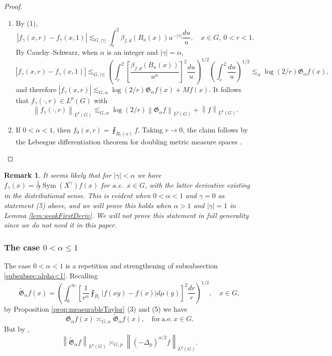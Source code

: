 \documentclass[11pt,reqno]{amsart}
\newtheorem{remark}[theorem]{Remark}
\newcommand{\1}{\mathbf 1}
\begin{document}
\begin{proof}
\begin{enumerate}
\item By (1),
\[
\left|f_\gamma \left(x,r\right)-f_\gamma\left(x,1\right)\right|\lesssim_{G,\left|\gamma\right|} \int_{r}^{2} \beta_{f,d}\left(B_u\left(x\right)\right)u^{-\left|\gamma\right|}\frac{du}{u},\quad x\in G, ~0<r<1.
\]
By Cauchy--Schwarz, when $\alpha$ is an integer and $\left|\gamma\right|=\alpha$,
\[
\left|f_\gamma \left(x,r\right)-f_\gamma\left(x,1\right)\right|\lesssim_{G,\left|\gamma\right|} \left(\int_{r}^{2}\left[\frac{\beta_{f,d}\left(B_u\left(x\right)\right)}{u^\alpha}\right]^2\frac{du}{u}\right)^{1/2}\left(\int_{r}^{2}\frac{du}{u}\right)^{1/2}\lesssim_\alpha \log\left(2/r\right)\mathfrak{G}_\alpha f\left(x\right),
\]
and therefore $\left|f_\gamma\left(x,r\right)\right|\lesssim_{G,\alpha}\log\left(2/r\right)\mathfrak{G}_\alpha f\left(x\right)+Mf\left(x\right)$. It follows that $f_\gamma\left(\cdot,r\right)\in L^p\left(G\right)$ with
\[
\left\|f_\gamma\left(\cdot,r\right)\right\|_{L^p\left(G\right)}\lesssim_{G,\alpha} \log\left(2/r\right)\left\|\mathfrak{G}_\alpha f\right\|_{L^p\left(G\right)}+\left\|f\right\|_{L^p\left(G\right)}.
\]
\item If $0<\alpha<1$, then $f_0\left(x,r\right)=\fint_{B_r\left(x\right)}f$. Taking $r\to 0$, the claim follows by the Lebesgue differentiation theorem for doubling metric measure spaces \cite[(3.4.10)]{heinonen2015sobolev}.
\end{enumerate}




\end{proof}
\begin{remark}
It seems likely that for $\left|\gamma\right|<\alpha$ we have $f_\gamma(x)=\frac{1}{\gamma!}\operatorname{Sym}\left(X^\gamma\right)f(x)$ for a.e.~$x\in G$, with the latter derivative existing in the distributional sense. This is evident when $0<\alpha<1$ and $\gamma=0$ as statement (5) above, and we will prove this holds when $\alpha>1$ and $\left|\gamma\right|=1$ in Lemma \ref{lem:weakFirstDeriv}. We will not prove this statement in full generality since we do not need it in this paper.
\end{remark}

\subsubsection{The case $0<\alpha\le 1$}\label{subsubsec:gtrsimalphale1}
The case $0<\alpha<1$ is a repetition and strengthening of subsubsection \ref{subsubsec:alpha<1}. Recalling
\[
\tilde{\mathfrak{G}}_\alpha f\left(x\right)= \left(\int_0^\infty \left[\frac{1}{r^\alpha}\fint_{B_r}\left|f\left(xy\right)-f\left(x\right)\right|d\mu\left(y\right)\right]^2 \frac{dr}{r}\right)^{1/2},\quad x\in G,
\]
by Proposition \ref{prop:measurableTaylor} (3) and (5) we have
\[
\mathfrak{G}_\alpha f\left(x\right)\asymp_{G,\alpha}\tilde{\mathfrak{G}}_\alpha f\left(x\right),\quad \mathrm{for~a.e.~} x\in G.
\]
But by \cite[Theorem 5]{coulhon2001sobolev},
\[
\left\|\tilde{\mathfrak{G}}_\alpha f\right\|_{L^p\left(G\right)}\asymp_{G,p} \left\|\left(-\Delta_p\right)^{\alpha/2}f\right\|_{L^p\left(G\right)}.
\]
\end{document}

